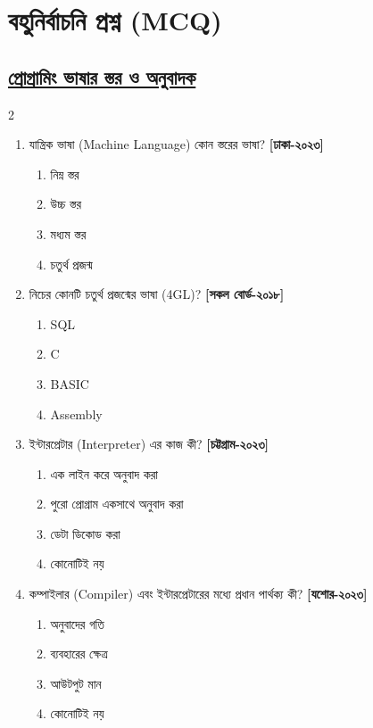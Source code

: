 \section{বহুনির্বাচনি প্রশ্ন (MCQ)}

\subsection*{\textbf{\underline{প্রোগ্রামিং ভাষার স্তর ও অনুবাদক}}}

\begin{multicols}{2}
\begin{enumerate}

\item যান্ত্রিক ভাষা (Machine Language) কোন স্তরের ভাষা? \textbf{[ঢাকা-২০২৩]}
\begin{enumerate}[label=\alph*)]
\item নিম্ন স্তর \checkmark
\item উচ্চ স্তর
\item মধ্যম স্তর
\item চতুর্থ প্রজন্ম
\end{enumerate}

\item নিচের কোনটি চতুর্থ প্রজন্মের ভাষা (4GL)? \textbf{[সকল বোর্ড-২০১৮]}
\begin{enumerate}[label=\alph*)]
\item SQL \checkmark
\item C
\item BASIC
\item Assembly
\end{enumerate}

\item ইন্টারপ্রেটার (Interpreter) এর কাজ কী? \textbf{[চট্টগ্রাম-২০২৩]}
\begin{enumerate}[label=\alph*)]
\item এক লাইন করে অনুবাদ করা \checkmark
\item পুরো প্রোগ্রাম একসাথে অনুবাদ করা
\item ডেটা ডিকোড করা
\item কোনোটিই নয়
\end{enumerate}

\item কম্পাইলার (Compiler) এবং ইন্টারপ্রেটারের মধ্যে প্রধান পার্থক্য কী? \textbf{[যশোর-২০২৩]}
\begin{enumerate}[label=\alph*)]
\item অনুবাদের গতি \checkmark
\item ব্যবহারের ক্ষেত্র
\item আউটপুট মান
\item কোনোটিই নয়
\end{enumerate}


\end{enumerate}
\end{multicols}
